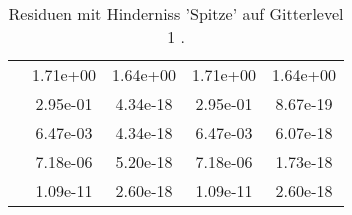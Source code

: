 \begin{table}
\begin{tabular}{c|cc|cc|}
\multicolumn{1}{|c|}{} & \multicolumn{1}{|c|}{  1.71e+00} & \multicolumn{1}{|c|}{  1.64e+00} & \multicolumn{1}{|c|}{  1.71e+00} & \multicolumn{1}{|c|}{  1.64e+00} \\ 
\multicolumn{1}{|c|}{} & \multicolumn{1}{|c|}{  2.95e-01} & \multicolumn{1}{|c|}{  4.34e-18} & \multicolumn{1}{|c|}{  2.95e-01} & \multicolumn{1}{|c|}{  8.67e-19} \\ 
\multicolumn{1}{|c|}{} & \multicolumn{1}{|c|}{  6.47e-03} & \multicolumn{1}{|c|}{  4.34e-18} & \multicolumn{1}{|c|}{  6.47e-03} & \multicolumn{1}{|c|}{  6.07e-18} \\ 
\multicolumn{1}{|c|}{} & \multicolumn{1}{|c|}{  7.18e-06} & \multicolumn{1}{|c|}{  5.20e-18} & \multicolumn{1}{|c|}{  7.18e-06} & \multicolumn{1}{|c|}{  1.73e-18} \\ 
\multicolumn{1}{|c|}{} & \multicolumn{1}{|c|}{  1.09e-11} & \multicolumn{1}{|c|}{  2.60e-18} & \multicolumn{1}{|c|}{  1.09e-11} & \multicolumn{1}{|c|}{  2.60e-18} \\ 
\hline 
\end{tabular}\caption{Residuen mit Hinderniss 'Spitze' auf Gitterlevel 1 .}\label{tab:Residuum_Spitze_level1}
\end{table} 
